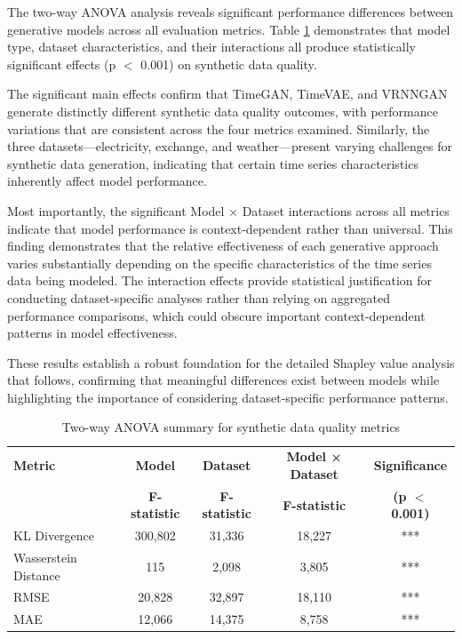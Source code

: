 \documentclass{article}
\begin{document}
The two-way ANOVA analysis reveals significant performance differences between generative models across all evaluation metrics. Table \ref{tab:anova_summary} demonstrates that model type, dataset characteristics, and their interactions all produce statistically significant effects (p $<$ 0.001) on synthetic data quality.

The significant main effects confirm that TimeGAN, TimeVAE, and VRNNGAN generate distinctly different synthetic data quality outcomes, with performance variations that are consistent across the four metrics examined. Similarly, the three datasets—electricity, exchange, and weather—present varying challenges for synthetic data generation, indicating that certain time series characteristics inherently affect model performance.

Most importantly, the significant Model × Dataset interactions across all metrics indicate that model performance is context-dependent rather than universal. This finding demonstrates that the relative effectiveness of each generative approach varies substantially depending on the specific characteristics of the time series data being modeled. The interaction effects provide statistical justification for conducting dataset-specific analyses rather than relying on aggregated performance comparisons, which could obscure important context-dependent patterns in model effectiveness.

These results establish a robust foundation for the detailed Shapley value analysis that follows, confirming that meaningful differences exist between models while highlighting the importance of considering dataset-specific performance patterns.

\begin{table}[H]
\centering
\caption{Two-way ANOVA summary for synthetic data quality metrics}
\label{tab:anova_summary}
\begin{tabular}{lcccc}
\toprule
\textbf{Metric} & \textbf{Model} & \textbf{Dataset} & \textbf{Model × Dataset} & \textbf{Significance} \\
 & \textbf{F-statistic} & \textbf{F-statistic} & \textbf{F-statistic} & \textbf{(p $<$ 0.001)} \\
\midrule
KL Divergence & 300,802 & 31,336 & 18,227 & *** \\
Wasserstein Distance & 115 & 2,098 & 3,805 & *** \\
RMSE & 20,828 & 32,897 & 18,110 & *** \\
MAE & 12,066 & 14,375 & 8,758 & *** \\
\bottomrule
\end{tabular}
\end{table}
\end{document}
